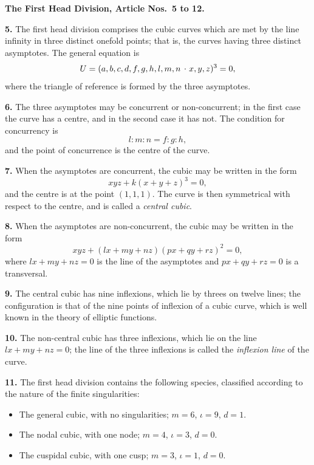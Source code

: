 \documentclass[11pt,a4paper]{article}
\theoremstyle{plain}
\theoremstyle{definition}
\newcommand{\lc}{\kern.17em\raise.5ex\hbox{.}\kern.08em}  %
\begin{document}
\bigskip

\noindent\textbf{The First Head Division, Article Nos.~5 to 12.}

\medskip

\textbf{5.} The first head division comprises the cubic curves which are met by the line infinity in three distinct onefold points; that is, the curves having three distinct asymptotes. The general equation is
\[
U = (a, b, c, d, f, g, h, l, m, n \mathbin{\lc} x, y, z)^3 = 0,
\]
where the triangle of reference is formed by the three asymptotes.

\textbf{6.} The three asymptotes may be concurrent or non-concurrent; in the first case the curve has a centre, and in the second case it has not. The condition for concurrency is
\[
l : m : n = f : g : h,
\]
and the point of concurrence is the centre of the curve.

\textbf{7.} When the asymptotes are concurrent, the cubic may be written in the form
\[
xyz + k(x + y + z)^3 = 0,
\]
and the centre is at the point $(1, 1, 1)$. The curve is then symmetrical with respect to the centre, and is called a \textit{central cubic}.

\textbf{8.} When the asymptotes are non-concurrent, the cubic may be written in the form
\[
xyz + (lx + my + nz)(px + qy + rz)^2 = 0,
\]
where $lx + my + nz = 0$ is the line of the asymptotes and $px + qy + rz = 0$ is a transversal.

\textbf{9.} The central cubic has nine inflexions, which lie by threes on twelve lines; the configuration is that of the nine points of inflexion of a cubic curve, which is well known in the theory of elliptic functions.

\textbf{10.} The non-central cubic has three inflexions, which lie on the line $lx + my + nz = 0$; the line of the three inflexions is called the \textit{inflexion line} of the curve.

\textbf{11.} The first head division contains the following species, classified according to the nature of the finite singularities:
\begin{itemize}
\item[(1)] The general cubic, with no singularities; $m = 6$, $\iota = 9$, $d = 1$.
\item[(2)] The nodal cubic, with one node; $m = 4$, $\iota = 3$, $d = 0$.
\item[(3)] The cuspidal cubic, with one cusp; $m = 3$, $\iota = 1$, $d = 0$.
\end{itemize}
\end{document}
